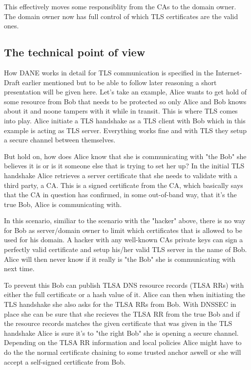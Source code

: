 This effectively moves some responsiblity from the CAs to the domain owner.
The domain owner now has full control of which TLS certificates are the valid ones.

\subsection{The technical point of view}
How DANE works in detail for TLS communication is specified in the Internet-Draft earlier mentioned\cite{rfc:draft-dane} but to be able to follow later reasoning a short presentation will be given here.
Let's take an example, Alice wants to get hold of some resource from Bob that needs to be protected so only Alice and Bob knows about it and noone tampers with it while in transit.
This is where TLS comes into play.
Alice initiate a TLS handshake as a TLS client with Bob which in this example is acting as TLS server. 
Everything works fine and with TLS they setup a secure channel between themselves.

But hold on, how does Alice know that she is communicating with "the Bob" she believes it is or is it someone else that is trying to set her up?
In the initial TLS handshake Alice retrieves a server certificate that she needs to validate with a third party, a CA.
This is a signed certificate from the CA, which basically says that the CA in question has confirmed, in some out-of-band way, that it's the true Bob, Alice is communicating with.

In this scenario, similiar to the scenario with the "hacker" above, there is no way for Bob as server/domain owner to limit which certificates that is allowed to be used for his domain.
A hacker with any well-known CAs private keys can sign a perfectly valid certificate and setup his/her valid TLS server in the name of Bob.
Alice will then never know if it really is "the Bob" she is communicating with next time.

To prevent this Bob can publish TLSA DNS resource records (TLSA RRs)\cite[ch. 2]{rfc:draft-dane} with either the full certificate or a hash value of it.
Alice can then when initiating the TLS handshake she also asks for the TLSA RRs from Bob.
With DNSSEC in place she can be sure that she recieves the TLSA RR from the true Bob and if the resource records matches the given certificate that was given in the TLS handshake Alice is sure it's to "the right Bob" she is opening a secure channel.
Depending on the TLSA RR information and local policies Alice might have to do the the normal certificate chaining to some trusted anchor aswell or she will accept a self-signed certificate from Bob.

